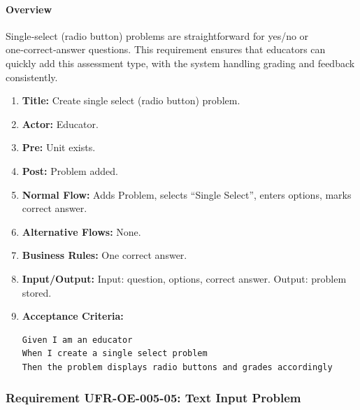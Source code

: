 \paragraph{Overview}
Single‑select (radio button) problems are straightforward for yes/no or one‑correct‑answer questions. This requirement ensures that educators can quickly add this assessment type, with the system handling grading and feedback consistently.
\begin{enumerate}[label=\textbf{\arabic*.}]
\item \textbf{Title:} Create single select (radio button) problem.
\item \textbf{Actor:} Educator.
\item \textbf{Pre:} Unit exists.
\item \textbf{Post:} Problem added.
\item \textbf{Normal Flow:} Adds Problem, selects “Single Select”, enters options, marks correct answer.
\item \textbf{Alternative Flows:} None.
\item \textbf{Business Rules:} One correct answer.
\item \textbf{Input/Output:} Input: question, options, correct answer. Output: problem stored.
\item \textbf{Acceptance Criteria:}
    \begin{verbatim}
Given I am an educator
When I create a single select problem
Then the problem displays radio buttons and grades accordingly
    \end{verbatim}
\end{enumerate}

\subsubsection{Requirement UFR-OE-005-05: Text Input Problem}
